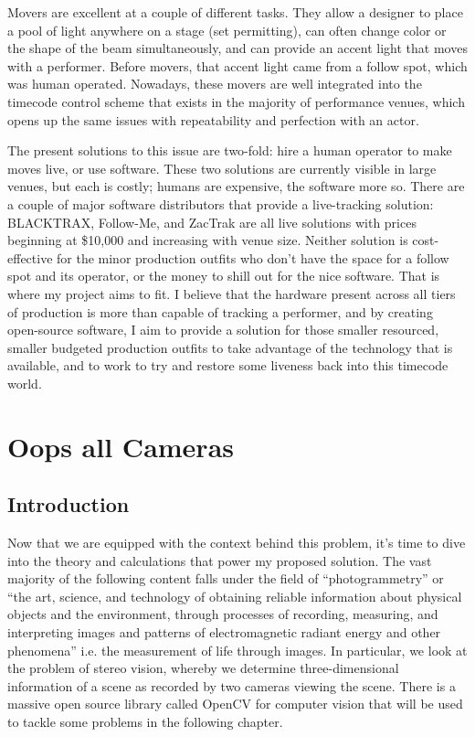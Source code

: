 \documentclass[
    12pt,
    twoside,
    bibstyle=chicago,
    headerstyle=uppercase,
	bibfile=biblatex_updating.bib
]{reedthesis}
\begin{document}
Movers are excellent at a couple of different tasks. They allow a designer to place a pool of light anywhere on a stage (set permitting), can often change color or the shape of the beam simultaneously, and can provide an accent light that moves with a performer. Before movers, that accent light came from a follow spot, which was human operated. Nowadays, these movers are well integrated into the timecode control scheme that exists in the majority of performance venues, which opens up the same issues with repeatability and perfection with an actor. 

The present solutions to this issue are two-fold: hire a human operator to make moves live, or use software. These two solutions are currently visible in large venues, but each is costly; humans are expensive, the software more so. There are a couple of major software distributors that provide a live-tracking solution: BLACKTRAX, Follow-Me, and ZacTrak are all live solutions with prices beginning at \$10,000 and increasing with venue size. Neither solution is cost-effective for the minor production outfits who don't have the space for a follow spot and its operator, or the money to shill out for the nice software. That is where my project aims to fit. I believe that the hardware present across all tiers of production is more than capable of tracking a performer, and by creating open-source software, I aim to provide a solution for those smaller resourced, smaller budgeted production outfits to take advantage of the technology that is available, and to work to try and restore some liveness back into this timecode world.


\chapter{Oops all Cameras}


\section{Introduction}


Now that we are equipped with the context behind this problem, it's time to dive into the theory and calculations that power my proposed solution. The vast majority of the following content falls under the field of “photogrammetry” or “the art, science, and technology of obtaining reliable information about physical objects and the environment, through processes of recording, measuring, and interpreting images and patterns of electromagnetic radiant energy and other phenomena” i.e. the measurement of life through images. In particular, we look at the problem of stereo vision, whereby we determine three-dimensional information of a scene as recorded by two cameras viewing the scene. There is a massive open source library called OpenCV for computer vision that will be used to tackle some problems in the following chapter. \autocite{pulliRealtimeComputerVision2012}
\end{document}
